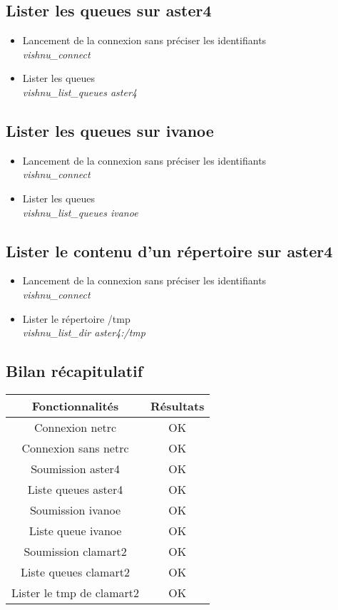 \documentclass{article}
\begin{document}
\subsection{Lister les queues sur aster4}
\begin{itemize}
\item Lancement de la connexion sans préciser les identifiants\\
  \textit{vishnu\_connect}
\item Lister les queues\\
  \textit{vishnu\_list\_queues aster4} \\
\end{itemize}

\subsection{Lister les queues sur ivanoe}
\begin{itemize}
\item Lancement de la connexion sans préciser les identifiants\\
  \textit{vishnu\_connect}
\item Lister les queues\\
  \textit{vishnu\_list\_queues ivanoe} \\
\end{itemize}

\subsection{Lister le contenu d'un r\'epertoire sur aster4}
\begin{itemize}
\item Lancement de la connexion sans préciser les identifiants\\
  \textit{vishnu\_connect}
\item Lister le r\'epertoire /tmp\\
  \textit{vishnu\_list\_dir aster4:/tmp}
\end{itemize}

\subsection{Bilan r\'ecapitulatif}

\begin{tabular}{|c|c|}
\hline 
Fonctionnalités & Résultats \\
\hline 
Connexion netrc & OK \\
\hline
Connexion sans netrc & OK \\
\hline
Soumission aster4 & OK \\
\hline
Liste queues aster4 & OK \\
\hline
Soumission ivanoe & OK \\
\hline
Liste queue ivanoe & OK \\
\hline
Soumission clamart2 & OK \\
\hline
Liste queues clamart2 & OK \\
\hline
Lister le tmp de clamart2 & OK \\
\hline
\end{tabular}
\end{document}
